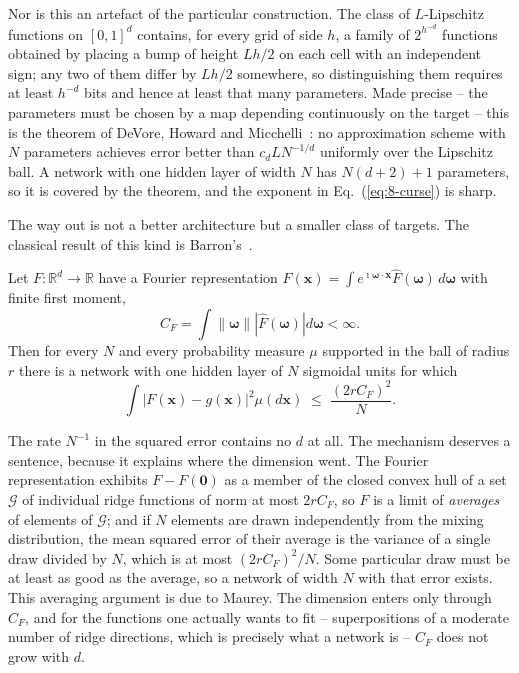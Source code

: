Nor is this an artefact of the particular construction.  The class of
$L$-Lipschitz functions on $[0,1]^{d}$ contains, for every grid of side $h$, a
family of $2^{h^{-d}}$ functions obtained by placing a bump of height $Lh/2$ on
each cell with an independent sign; any two of them differ by $Lh/2$ somewhere,
so distinguishing them requires at least $h^{-d}$ bits and hence at least that
many parameters.  Made precise -- the parameters must be chosen by a map
depending continuously on the target -- this is the theorem of DeVore, Howard
and Micchelli~\cite{devore1989}: no approximation scheme with $N$ parameters
achieves error better than $c_dLN^{-1/d}$ uniformly over the Lipschitz ball.  A
network with one hidden layer of width $N$ has $N(d+2)+1$ parameters, so it is
covered by the theorem, and the exponent in Eq.~(\ref{eq:8-curse}) is sharp.

The way out is not a better architecture but a smaller class of targets.  The
classical result of this kind is Barron's~\cite{barron1993}.

\begin{theorem}[Barron]
\label{thm:8-barron}
Let $F:\mathbb{R}^{d}\rightarrow\mathbb{R}$ have a Fourier representation
$F(\bm{x})=\int e^{\imath\bm{\omega}\cdot\bm{x}}\hat{F}(\bm{\omega})\,d\bm{\omega}$
with finite first moment,
\begin{equation}
  C_F = \int \left\|\bm{\omega}\right\|
        \left|\hat{F}(\bm{\omega})\right| d\bm{\omega} < \infty .
  \label{eq:8-barronnorm}
\end{equation}
Then for every $N$ and every probability measure $\mu$ supported in the ball of
radius $r$ there is a network with one hidden layer of $N$ sigmoidal units for
which
\begin{equation}
  \int\left|F(\bm{x})-g(\bm{x})\right|^{2}\mu(d\bm{x})
   \;\le\; \frac{\left(2rC_F\right)^{2}}{N} .
  \label{eq:8-barron}
\end{equation}
\end{theorem}

The rate $N^{-1}$ in the squared error contains no $d$ at all.  The mechanism
deserves a sentence, because it explains where the dimension went.  The Fourier
representation exhibits $F-F(\bm{0})$ as a member of the closed convex hull of
a set $\mathcal{G}$ of individual ridge functions of norm at most $2rC_F$, so
$F$ is a limit of \emph{averages} of elements of $\mathcal{G}$; and if $N$
elements are drawn independently from the mixing distribution, the mean squared
error of their average is the variance of a single draw divided by $N$, which
is at most $(2rC_F)^{2}/N$.  Some particular draw must be at least as good as
the average, so a network of width $N$ with that error exists.  This averaging
argument is due to Maurey.  The dimension enters only through $C_F$, and for
the functions one actually wants to fit -- superpositions of a moderate number
of ridge directions, which is precisely what a network is -- $C_F$ does not
grow with $d$.

